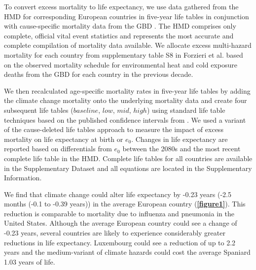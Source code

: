 \documentclass[12pt,]{article}
\begin{document}
To convert excess mortality to life expectancy, we use data gathered
from the HMD \citep{HMD} for corresponding European countries in
five-year life tables in conjunction with cause-specific mortality data
from the GBD \citep{GBD, wang2012age}. The HMD comprises only complete,
official vital event statistics and represents the most accurate and
complete compilation of mortality data available. We allocate excess
multi-hazard mortality for each country from supplementary table S8 in
Forzieri et al. \citep{forzieri2017increasing} based on the observed
mortality schedule for environmental heat and cold exposure deaths from
the GBD for each country in the previous decade.

We then recalculated age-specific mortality rates in five-year life
tables by adding the climate change mortality onto the underlying
mortality data and create four subsequent life tables (\(baseline\),
\(low\), \(mid\), \(high\)) using standard life table techniques
\citep{wunsch2013life} based on the published confidence intervals from
\citep{forzieri2017increasing}. We used a variant of the cause-deleted
life tables approach
\citep{brand2005approximations, beltran2008integrated} to measure the
impact of excess mortality on life expectancy at birth or \(e_0\).
Changes in life expectancy are reported based on differentials from
\(e_0\) between the 2080s and the most recent complete life table in the
HMD. Complete life tables for all countries are available in the
Supplementary Dataset and all equations are located in the Supplementary
Information.

We find that climate change could alter life expectancy by -0.23 years
(-2.5 months (-0.1 to -0.39 years)) in the average European country
(\textbf{\autoref{figure1}}). This reduction is comparable to mortality
due to influenza and pneumonia \citep{arias2013united} in the United
States. Although the average European country could see a change of
-0.23 years, several countries are likely to experience considerably
greater reductions in life expectancy. Luxembourg could see a reduction
of up to 2.2 years and the medium-variant of climate hazards could cost
the average Spaniard 1.03 years of life.
\end{document}
